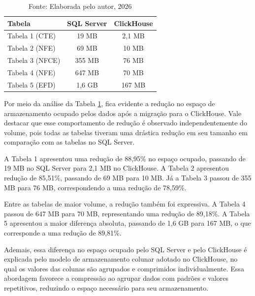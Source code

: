 \begin{table}[H]
\centering
\caption{Comparação do espaço de armazenamento entre SQL Server e ClickHouse}
\label{tab:comparacao_armazenamento}
\begin{tabular}{lcc}
\toprule
\textbf{Tabela} & \textbf{SQL Server} & \textbf{ClickHouse} \\
\midrule
Tabela 1 (CTE)  & 19 MB   & 2,1 MB \\
Tabela 2 (NFE)  & 69 MB   & 10 MB \\
Tabela 3 (NFCE) & 355 MB  & 76 MB \\
Tabela 4 (NFE)  & 647 MB  & 70 MB \\
Tabela 5 (EFD)  & 1,6 GB  & 167 MB \\
\bottomrule
\end{tabular}

\caption*{\small Nomes das tabelas anonimizados por confidencialidade; Tabela 4 refere-se a uma
tabela de itens vinculada à NFE, distinta da Tabela 2.}
\caption*{\small Fonte: Elaborada pelo autor, 2026}
\end{table}

Por meio da análise da Tabela \ref{tab:comparacao_armazenamento}, fica evidente a redução no espaço 
de armazenamento ocupado pelos dados após a migração para o ClickHouse. Vale destacar que esse 
comportamento de redução é observado independentemente do volume, pois todas as tabelas tiveram uma
drástica redução em seu tamanho em comparação com as tabelas no SQL Server.

A Tabela 1 apresentou uma redução de 88,95\% no espaço ocupado, passando de 19 MB no SQL Server
para 2,1 MB no ClickHouse. A Tabela 2 apresentou redução de 85,51\%, passando de 69 MB para 10 MB.
Já a Tabela 3 passou de 355 MB para 76 MB, correspondendo a uma redução de 78,59\%.

Entre as tabelas de maior volume, a redução também foi expressiva. A Tabela 4 passou de
647 MB para 70 MB, representando uma redução de 89,18\%. A Tabela 5 apresentou a maior
diferença absoluta, passando de 1,6 GB para 167 MB, o que corresponde a uma redução de 89,81\%.

Ademais, essa diferença no espaço ocupado pelo SQL Server e pelo ClickHouse é explicada pelo modelo de
armazenamento colunar adotado no ClickHouse, no qual os valores das colunas são agrupados 
e comprimidos individualmente. Essa abordagem favorece a compressão ao agrupar dados com padrões 
e valores repetitivos, reduzindo o espaço necessário para seu armazenamento.


